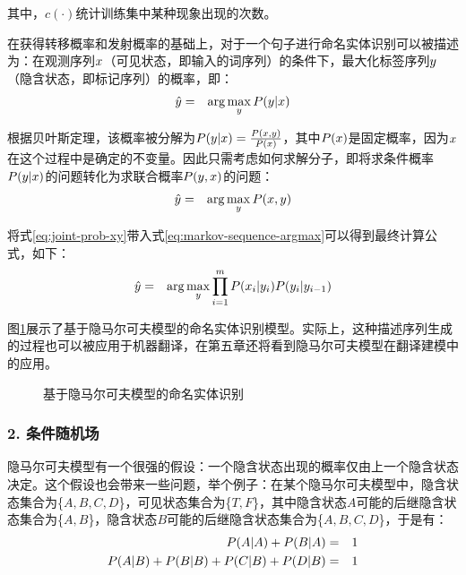 \noindent 其中，${c}(\cdot)$统计训练集中某种现象出现的次数。

\parinterval 在获得转移概率和发射概率的基础上，对于一个句子进行命名实体识别可以被描述为：在观测序列${x}$（可见状态，即输入的词序列）的条件下，最大化标签序列${y}$（隐含状态，即标记序列）的概率，即：
\begin{eqnarray}
\hat{{y}} &=& \arg\max_{{y}}{P}({y}|{x})
\label{eq:3.3-3}
\end{eqnarray}

\parinterval 根据贝叶斯定理，该概率被分解为${P}({y}|{x})=\frac{{P}({x},{y})}{{P}({x})}$，其中${P}({x})$是固定概率，因为${x}$在这个过程中是确定的不变量。因此只需考虑如何求解分子，即将求条件概率${P}({y}|{x})$的问题转化为求联合概率${P}({y},{x})$的问题：
\begin{eqnarray}
\hat{{y}} &=& \arg\max_{{y}}{P}({x},{y}) \label{eq:markov-sequence-argmax}
\label{eq:3.3-4}
\end{eqnarray}

\parinterval 将式\eqref{eq:joint-prob-xy}带入式\eqref{eq:markov-sequence-argmax}可以得到最终计算公式，如下：
\begin{eqnarray}
\hat{{y}} &=& \arg\max_{{y}}\prod_{i=1}^{m}{P}(x_i|y_i){P}(y_i|y_{i-1})
\label{eq:3.3-5}
\end{eqnarray}

\parinterval 图\ref{fig:3.3-4}展示了基于隐马尔可夫模型的命名实体识别模型。实际上，这种描述序列生成的过程也可以被应用于机器翻译，在第五章还将看到隐马尔可夫模型在翻译建模中的应用。

\begin{figure}[htp]
\centering

\caption{基于隐马尔可夫模型的命名实体识别}
\label{fig:3.3-4}
\end{figure}


\subsubsection{2. 条件随机场}

\parinterval 隐马尔可夫模型有一个很强的假设：一个隐含状态出现的概率仅由上一个隐含状态决定。这个假设也会带来一些问题，举个例子：在某个隐马尔可夫模型中，隐含状态集合为\{$A, B, C, D$\}，可见状态集合为\{$T, F$\}，其中隐含状态$A$可能的后继隐含状态集合为\{$A, B$\}，隐含状态$B$可能的后继隐含状态集合为\{$A, B, C, D$\}，于是有：
\begin{eqnarray}
{P}(A|A)+{P}(B|A) & = & 1 \label{eq:3.3-6} \\
{P}(A|B)+{P}(B|B)+{P}(C|B)+{P}(D|B) & = & 1 \label{eq:3.3-7}
\end{eqnarray}


